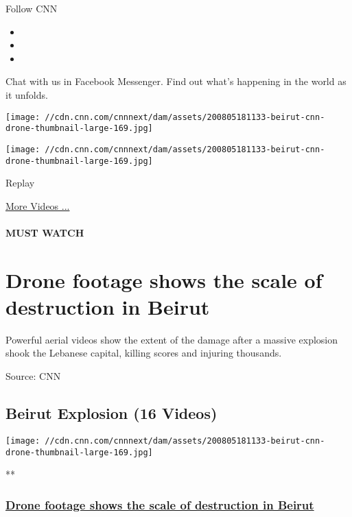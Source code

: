 Follow CNN

\begin{itemize}
\item
\item
\item
\end{itemize}

Chat with us in Facebook Messenger. Find out what's happening in the
world as it unfolds.

\texttt{[image: //cdn.cnn.com/cnnnext/dam/assets/200805181133-beirut-cnn-drone-thumbnail-large-169.jpg]}

\texttt{[image: //cdn.cnn.com/cnnnext/dam/assets/200805181133-beirut-cnn-drone-thumbnail-large-169.jpg]}\href{javascript:void(0);}{}

Replay

\href{/videos}{More Videos ...}

\hypertarget{must-watch}{%
\paragraph{MUST WATCH}\label{must-watch}}

\hypertarget{drone-footage-shows-the-scale-of-destruction-in-beirut}{%
\section{Drone footage shows the scale of destruction in
Beirut}\label{drone-footage-shows-the-scale-of-destruction-in-beirut}}

Powerful aerial videos show the extent of the damage after a massive
explosion shook the Lebanese capital, killing scores and injuring
thousands.

Source: CNN

\hypertarget{beirut-explosion-16-videos}{%
\subsection{Beirut Explosion (16
Videos)}\label{beirut-explosion-16-videos}}

\href{/videos/world/2020/08/05/beirut-explosion-lebanon-destruction-drone-video-lon-orig-bks.cnn/video/playlists/beirut-explosion/}{}

\texttt{[image: //cdn.cnn.com/cnnnext/dam/assets/200805181133-beirut-cnn-drone-thumbnail-large-169.jpg]}

**

\hypertarget{drone-footage-shows-the-scale-of-destruction-in-beirut-1}{%
\subsubsection{\texorpdfstring{\href{/videos/world/2020/08/05/beirut-explosion-lebanon-destruction-drone-video-lon-orig-bks.cnn/video/playlists/beirut-explosion/}{Drone
footage shows the scale of destruction in
Beirut}}{Drone footage shows the scale of destruction in Beirut}}\label{drone-footage-shows-the-scale-of-destruction-in-beirut-1}}

